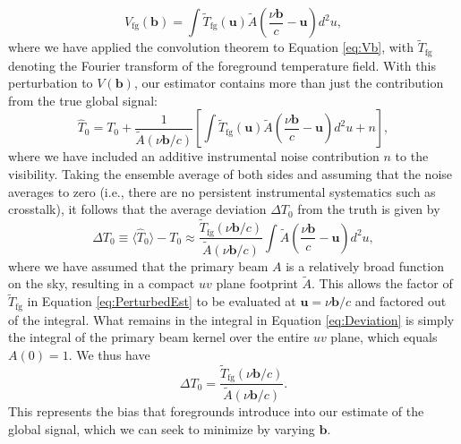 \documentclass[twocolumn,apj,numberedappendix]{emulateapj}
\begin{document}
\begin{equation}
V_\textrm{fg} (\mathbf{b}) = \int  \widetilde{T}_\textrm{fg} (\mathbf{u}) \widetilde{A} \left( \frac{\nu \mathbf{b}}{c} - \mathbf{u} \right) d^2 u,
\end{equation}
where we have applied the convolution theorem to Equation \eqref{eq:Vb}, with $\widetilde{T}_\textrm{fg}$ denoting the Fourier transform of the foreground temperature field.  With this perturbation to $V(\mathbf{b})$, our estimator contains more than just the contribution from the true global signal:
\begin{equation}
\label{eq:PerturbedEst}
\widehat{T}_0 = T_0 + \frac{1}{\widetilde{A} \left( \nu \mathbf{b} / c \right)} \left[ \int  \widetilde{T}_\textrm{fg} (\mathbf{u}) \widetilde{A} \left( \frac{\nu \mathbf{b}}{c} - \mathbf{u} \right) d^2 u + n \right],
\end{equation}
where we have included an additive instrumental noise contribution $n$ to the visibility.  Taking the ensemble average of both sides and assuming that the noise averages to zero (i.e., there are no persistent instrumental systematics such as crosstalk), it follows that the average deviation $\Delta T_0$ from the truth is given by
\begin{equation}
\label{eq:Deviation}
\Delta T_0 \equiv \langle \widehat{T}_0 \rangle - T_0 \approx \frac{\widetilde{T}_\textrm{fg} (\nu \mathbf{b} / c)}{\widetilde{A} \left( \nu \mathbf{b} / c \right)} \int   \widetilde{A} \left( \frac{\nu \mathbf{b}}{c} - \mathbf{u} \right) d^2 u,
\end{equation}
where we have assumed that the primary beam $A$ is a relatively broad function on the sky, resulting in a compact $uv$ plane footprint $\widetilde{A}$.  This allows the factor of $\widetilde{T}_\textrm{fg}$ in Equation \eqref{eq:PerturbedEst} to be evaluated at $\mathbf{u} = \nu \mathbf{b} / c$ and factored out of the integral. What remains in the integral in Equation \eqref{eq:Deviation} is simply the integral of the primary beam kernel over the entire $uv$ plane, which equals $A(0) = 1$. We thus have
\begin{equation}
\Delta T_0 = \frac{\widetilde{T}_\textrm{fg} (\nu \mathbf{b} / c)}{\widetilde{A} \left( \nu \mathbf{b} / c \right)}.
\end{equation}
This represents the bias that foregrounds introduce into our estimate of the global signal, which we can seek to minimize by varying $\mathbf{b}$.
\end{document}
